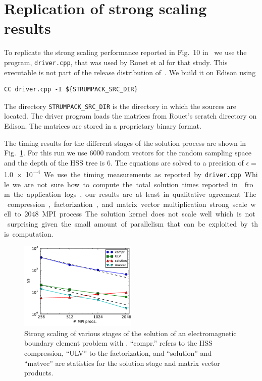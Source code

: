 \documentclass{acmsmall}
\begin{document}
\section{Replication of strong scaling results}

To replicate the strong scaling performance reported in Fig.~10
in~\cite{rouet:strumpack} we use the program, \verb!driver.cpp!,
that was used by Rouet et al for that study.  This executable is
not part of the release distribution of~\cite{rouet:strumpack}.
We build it on Edison using
\begin{verbatim}
CC driver.cpp -I ${STRUMPACK_SRC_DIR}
\end{verbatim}
The directory \verb!STRUMPACK_SRC_DIR! is the directory in which
the \strumpack{} sources are located.  The driver program loads
the matrices from Rouet's scratch directory on Edison.  The
matrices are stored in a proprietary binary format.

The timing results for the different stages of the solution
process are shown in Fig.~\ref{fig:strongscaling}.  For this run
we use 6000 random vectors for the random sampling space and the
depth of the HSS tree is 6.  The equations are solved to a
precision of $\epsilon=$\SI{1.0e-4}.  We use the timing
measurements as reported by \verb~driver.cpp~.  While we are not
sure how to compute the total solution times reported
in~\cite{rouet:strumpack} from the application logs, our results
are at least in qualitative agreement.  The compression,
factorization, and matrix vector multiplication strong scale well
to 2048 MPI process.  The solution kernel does not scale well
which is not surprising given the small amount of parallelism
that can be exploited by this computation.
\begin{figure}
  \begin{center}
  \includegraphics[width=0.5\textwidth]{strong_scaling}
  \end{center}
  \caption{Strong scaling of various stages of the solution of an
  electromagnetic boundary element problem with \strumpack{}.
  ``compr.'' refers to the HSS compression, ``ULV'' to the
  factorization,  and ``solution'' and ``matvec'' are statistics
  for the solution stage and matrix vector products.}
  \label{fig:strongscaling}
\end{figure}
\end{document}
